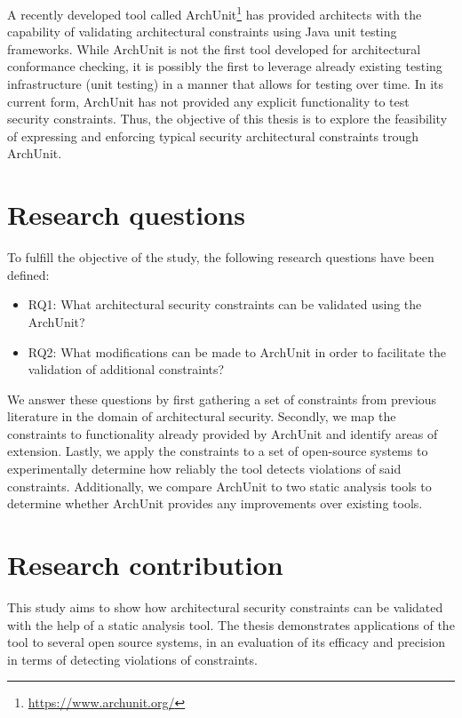 A recently developed tool called ArchUnit\footnote{\url{https://www.archunit.org/}} has provided architects with the capability of validating architectural constraints using Java unit testing frameworks. While ArchUnit is not the first tool developed for architectural conformance checking, it is possibly the first to leverage already existing testing infrastructure (unit testing) in a manner that allows for testing over time. In its current form, ArchUnit has not provided any explicit functionality to test security constraints. Thus, the objective of this thesis is to explore the feasibility of expressing and enforcing typical security architectural constraints trough ArchUnit.

\section{Research questions}
To fulfill the objective of the study, the following research questions have been defined:

\begin{itemize}
    \item RQ1: What architectural security constraints can be validated using the ArchUnit?
    \item RQ2: What modifications can be made to ArchUnit in order to facilitate the validation of additional constraints?
\end{itemize}

We answer these questions by first gathering a set of constraints from previous literature in the domain of architectural security. Secondly, we map the constraints to functionality already provided by ArchUnit and identify areas of extension. Lastly, we apply the constraints to a set of open-source systems to experimentally determine how reliably the tool detects violations of said constraints. Additionally, we compare ArchUnit to two static analysis tools to determine whether ArchUnit provides any improvements over existing tools. 

\section{Research contribution}

This study aims to show how architectural security constraints can be validated with the help of a static analysis tool. The thesis demonstrates applications of the tool to several open source systems, in an evaluation of its efficacy and precision in terms of detecting violations of constraints.



